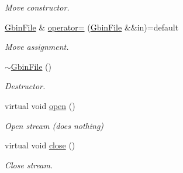 \begin{DoxyCompactItemize}
\begin{DoxyCompactList}\small\item\em Move constructor. \end{DoxyCompactList}\item 
\mbox{\label{classsamp_files_1_1_gbin_file_a8c1e649e522524a43e92086c5faa5d5e}} 
\hyperlink{classsamp_files_1_1_gbin_file}{Gbin\+File} \& \hyperlink{classsamp_files_1_1_gbin_file_a8c1e649e522524a43e92086c5faa5d5e}{operator=} (\hyperlink{classsamp_files_1_1_gbin_file}{Gbin\+File} \&\&in)=default
\begin{DoxyCompactList}\small\item\em Move assignment. \end{DoxyCompactList}\item 
\mbox{\label{classsamp_files_1_1_gbin_file_adf3cbbca2a4d63146a160b44176061bf}} 
\hyperlink{classsamp_files_1_1_gbin_file_adf3cbbca2a4d63146a160b44176061bf}{$\sim$\+Gbin\+File} ()
\begin{DoxyCompactList}\small\item\em Destructor. \end{DoxyCompactList}\item 
\mbox{\label{classsamp_files_1_1_gbin_file_a1afd82548553da38e55d0b1a45dd87de}} 
virtual void \hyperlink{classsamp_files_1_1_gbin_file_a1afd82548553da38e55d0b1a45dd87de}{open} ()
\begin{DoxyCompactList}\small\item\em Open stream (does nothing) \end{DoxyCompactList}\item 
\mbox{\label{classsamp_files_1_1_gbin_file_aff640b9e51117c18208444a86f2515cf}} 
virtual void \hyperlink{classsamp_files_1_1_gbin_file_aff640b9e51117c18208444a86f2515cf}{close} ()
\begin{DoxyCompactList}\small\item\em Close stream. \end{DoxyCompactList}\end{DoxyCompactItemize}

